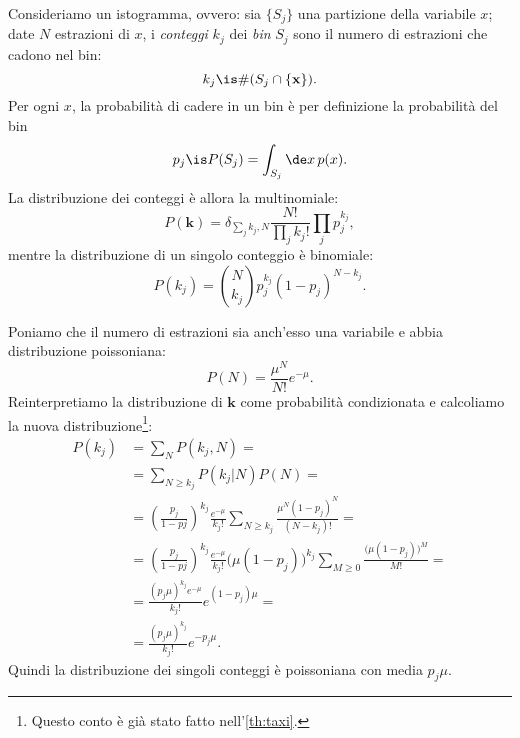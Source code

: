 
\label{sec:hist}

Consideriamo un istogramma, ovvero:
sia $\{S_j\}$ una partizione della variabile $x$;
date $N$ estrazioni di $x$, i \emph{conteggi} $k_j$ dei \emph{bin} $S_j$
sono il numero di estrazioni che cadono nel bin:
\begin{equation*}
	k_j \is \# (S_j \cap \{\mathbf x\}).
\end{equation*}
Per ogni $x$, la probabilità di cadere in un bin è per definizione la probabilità del bin
\begin{equation*}
	p_j \is P(S_j) = \int_{S_j} \de x\,p(x).
\end{equation*}
La distribuzione dei conteggi è allora la multinomiale:
\begin{equation*}
	P(\mathbf k)
	= \delta_{\sum_jk_j,N} \frac{N!}{\prod_jk_j!}\prod_j p_j^{k_j},
\end{equation*}
mentre la distribuzione di un singolo conteggio è binomiale:
\begin{equation*}
	P(k_j) = \binom N{k_j} p_j^{k_j} (1-p_j)^{N-k_j}.
\end{equation*}

Poniamo che il numero di estrazioni sia anch'esso una variabile e abbia distribuzione poissoniana:
\begin{equation*}
	P(N)
	= \frac{\mu^N}{N!}e^{-\mu}.
\end{equation*}
Reinterpretiamo la distribuzione di $\mathbf k$ come probabilità condizionata e calcoliamo la nuova distribuzione\footnote{Questo conto è già stato fatto nell'\autoref{th:taxi}.}:
\begin{align*}
	P(k_j)
	&= \sum_N P(k_j,N) = \\
	&= \sum_{N\ge k_j} P(k_j|N) P(N) = \\
	&= \left(\frac{p_j}{1-pj}\right)^{k_j} \frac{e^{-\mu}}{k_j!}
	\sum_{N\ge k_j} \frac{\mu^N (1-p_j)^N}{(N-k_j)!} = \\
	&= \left(\frac{p_j}{1-pj}\right)^{k_j} \frac{e^{-\mu}}{k_j!}
	\big(\mu(1-p_j)\big)^{k_j} \sum_{M\ge 0} \frac{\big(\mu(1-p_j)\big)^M}{M!} = \\
	&= \frac{(p_j\mu)^{k_j} e^{-\mu}}{k_j!} e^{(1-p_j)\mu} = \\
	&= \frac{(p_j\mu)^{k_j}}{k_j!} e^{-p_j\mu}.
\end{align*}
Quindi la distribuzione dei singoli conteggi è poissoniana con media $p_j\mu$.


